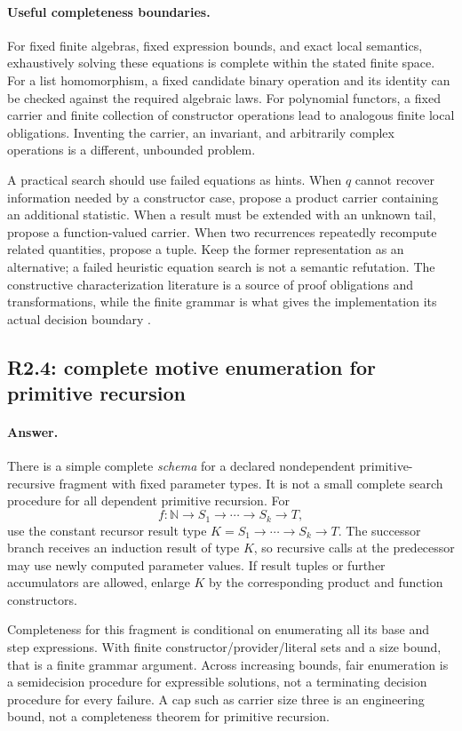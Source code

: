 \documentclass[11pt,a4paper]{article}
\newcommand{\answer}{\paragraph{Answer.}}
\theoremstyle{definition}
\theoremstyle{remark}
\begin{document}
\paragraph{Useful completeness boundaries.}
For fixed finite algebras, fixed expression bounds, and exact local semantics,
exhaustively solving these equations is complete within the stated finite
space. For a list homomorphism, a fixed candidate binary operation and its
identity can be checked against the required algebraic laws. For polynomial
functors, a fixed carrier and finite collection of constructor operations lead
to analogous finite local obligations. Inventing the carrier, an invariant,
and arbitrarily complex operations is a different, unbounded problem.

A practical search should use failed equations as hints. When $q$ cannot recover
information needed by a constructor case, propose a product carrier containing
an additional statistic. When a result must be extended with an unknown tail,
propose a function-valued carrier. When two recurrences repeatedly recompute
related quantities, propose a tuple. Keep the former representation as an
alternative; a failed heuristic equation search is not a semantic refutation.
The constructive characterization literature is a source of proof obligations
and transformations, while the finite grammar is what gives the implementation
its actual decision boundary \cite{gibbons,weber}.

\subsection{R2.4: complete motive enumeration for primitive recursion}
\answer There is a simple complete \emph{schema} for a declared nondependent
primitive-recursive fragment with fixed parameter types. It is not a small
complete search procedure for all dependent primitive recursion. For
\[
 f:\mathbb N\to S_1\to\cdots\to S_k\to T,
\]
use the constant recursor result type
$K=S_1\to\cdots\to S_k\to T$. The successor branch receives an induction result
of type $K$, so recursive calls at the predecessor may use newly computed
parameter values. If result tuples or further accumulators are allowed, enlarge
$K$ by the corresponding product and function constructors.

Completeness for this fragment is conditional on enumerating all its base and
step expressions. With finite constructor/provider/literal sets and a size
bound, that is a finite grammar argument. Across increasing bounds, fair
enumeration is a semidecision procedure for expressible solutions, not a
terminating decision procedure for every failure. A cap such as carrier size
three is an engineering bound, not a completeness theorem for primitive
recursion.
\end{document}
